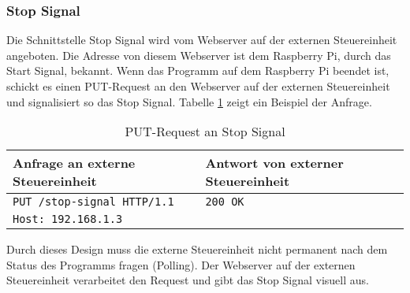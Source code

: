 \subsubsection{Stop Signal}
Die Schnittstelle Stop Signal wird vom Webserver auf der externen Steuereinheit angeboten. Die Adresse von diesem Webserver ist dem Raspberry Pi, durch das Start Signal, bekannt. Wenn das Programm auf dem Raspberry Pi beendet ist, schickt es einen PUT-Request an den Webserver auf der externen Steuereinheit und signalisiert so das Stop Signal. Tabelle \ref{tab:put-stop-signal} zeigt ein Beispiel der Anfrage.

\begin{table}[h!]
	\centering
	\begin{tabular}{|l|l|}
		\hline Anfrage an externe Steuereinheit	 & Antwort von externer Steuereinheit \\ 
		\hline \verb|PUT /stop-signal HTTP/1.1|  & \verb|200 OK| 					  \\
			   \verb|Host: 192.168.1.3| 		 & 							          \\
		\hline 
	\end{tabular} 
	\caption{PUT-Request an Stop Signal}
	\label{tab:put-stop-signal}
\end{table}

Durch dieses Design muss die externe Steuereinheit nicht permanent nach dem Status des Programms fragen (Polling). Der Webserver auf der externen Steuereinheit verarbeitet den Request und gibt das Stop Signal visuell aus.